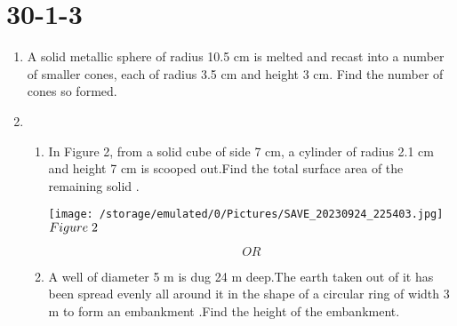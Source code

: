 \documentclass[15pt]{article}
\begin{document}
    \section{30-1-3}
    \begin{enumerate}
    \item A solid metallic sphere of radius 10.5 cm is melted and recast into a number of smaller cones, each of radius 3.5 cm and height 3 cm. Find the number of cones so formed.
    \item \begin{enumerate}
        \item In Figure 2, from a solid cube of side 7 cm, a cylinder of radius 2.1 cm and height 7 cm is scooped out.Find the total surface area of the remaining solid .
        \begin{center}
             \texttt{[image:             /storage/emulated/0/Pictures/SAVE\_20230924\_225403.jpg]}\\
             $Figure\hspace{0.1cm}  2$
        \end{center}
                                  $$OR$$
        \item A well of diameter 5 m is dug 24 m deep.The earth taken out of it has been spread evenly all around it in the shape of a circular ring of width 3 m to form an embankment .Find the height of the embankment.
         \end{enumerate}
   \end{enumerate}
\end{document}
